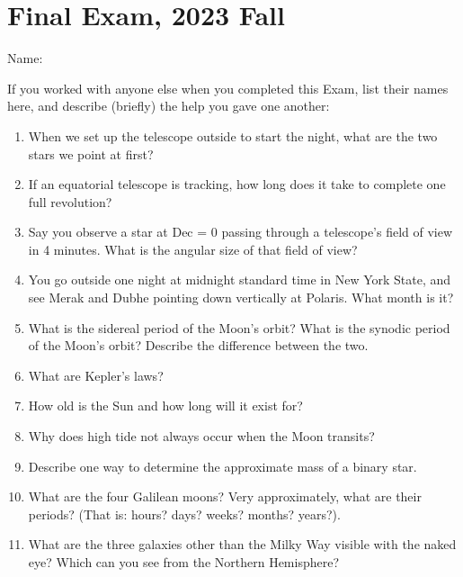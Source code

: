 \documentclass[12pt]{article}
\begin{document}
\section*{Final Exam, 2023 Fall}
\noindent
Name:
\vspace{0.25in}

\noindent
If you worked with anyone else when you completed this Exam, list their names
here, and describe (briefly) the help you gave one another:
\vspace{1in}

\begin{enumerate}
\item When we set up the telescope outside to start the night, what are
  the two stars we point at first?
  \vspace{80pt}
\item If an equatorial telescope is tracking, how long does it take to
  complete one full revolution? 
\vspace{80pt}
\item Say you observe a star at Dec = 0 passing through a telescope's
  field of view in 4 minutes. What is the angular size of that field
  of view?
\vspace{80pt}
\item You go outside one night at midnight standard time in New York
  State, and see Merak and Dubhe pointing down vertically at
  Polaris. What month is it? 
\vspace{80pt}
\item What is the sidereal period of the Moon's orbit?
      What is the synodic period of the Moon's orbit?
      Describe the difference between the two.
\vspace{80pt}
\item What are Kepler's laws?
\vspace{160pt}
\item How old is the Sun and how long will it exist for?
\vspace{80pt}
\item Why does high tide not always occur when the Moon transits?
\vspace{80pt}
\item Describe one way to determine the approximate mass of a binary
  star.
\vspace{80pt}
\item What are the four Galilean moons?  Very approximately, what are
  their periods? (That is: hours? days? weeks? months? years?).
\vspace{80pt}
\item What are the three galaxies other than the Milky Way visible with
  the naked eye? Which can you see from the Northern Hemisphere?
\vspace{80pt}
\end{enumerate}
\end{document}
